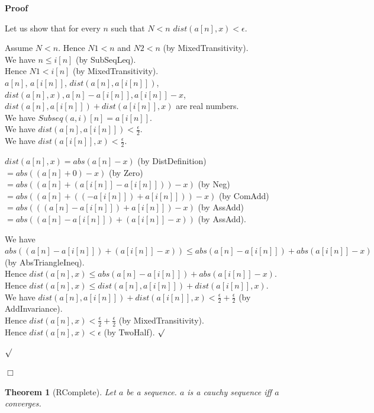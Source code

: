 \documentclass{article}
\newenvironment{forthel}{\begin{leftbar}}{\end{leftbar}}
\newenvironment{proof}{\noindent\textbf{Proof\ }}{\hspace*{\fill}$\Box$\medskip}
\newenvironment{subproof}{\begin{list}{}{}
		\item[\text{Proof}]}{\hfill $\surd$ \end{list}}
\newtheorem{theorem}{Theorem}
\newcommand{\halfeps}{\frac{\epsilon}{2}}
\newcommand{\dotequal}{=}
\begin{document}
\begin{forthel}
\begin{proof}
\begin{subproof}
			Let us show that for every $n$ such that $N < n$ $dist(a[n],x) < \epsilon$.
			\begin{subproof}
				Assume $N < n$. Hence $N1 < n$ and $N2 < n$ (by MixedTransitivity).\\
				We have $n \leq i[n]$ (by SubSeqLeq).\\
				Hence $N1 < i[n]$ (by MixedTransitivity).\\
				$a[n]$, $a[i[n]]$, $dist(a[n],a[i[n]])$, $dist(a[n],x), a[n] - a[i[n]], a[i[n]] - x$, $dist(a[n],a[i[n]]) + dist(a[i[n]],x)$ are real numbers.\\
				We have $Subseq(a,i)[n] = a[i[n]]$.\\
				We have $dist(a[n],a[i[n]]) < \halfeps$.\\
				We have $dist(a[i[n]],x) < \halfeps$.
				
				$dist(a[n],x) \dotequal abs(a[n] - x)$ (by DistDefinition)\\
				$\dotequal abs((a[n] + 0) - x)$ (by Zero)\\
				$\dotequal abs((a[n] + (a[i[n]] - a[i[n]])) - x)$ (by Neg)\\
				$\dotequal abs((a[n] + ((-a[i[n]]) + a[i[n]])) - x)$ (by ComAdd)\\
				$\dotequal abs(((a[n] - a[i[n]]) + a[i[n]]) - x)$ (by AssAdd)\\
				$\dotequal abs((a[n] - a[i[n]]) + (a[i[n]] - x))$ (by AssAdd).
				
				We have $abs((a[n] - a[i[n]]) + (a[i[n]] - x)) \leq abs(a[n] - a[i[n]]) + abs(a[i[n]] - x)$ (by AbsTriangleIneq).\\
				Hence $dist(a[n],x) \leq abs(a[n] - a[i[n]]) + abs(a[i[n]] - x)$.\\
				Hence $dist(a[n],x) \leq dist(a[n],a[i[n]]) + dist(a[i[n]],x)$.\\
				We have $dist(a[n],a[i[n]]) + dist(a[i[n]],x) < \halfeps + \halfeps$ (by AddInvariance).\\
				Hence $dist(a[n],x) < \halfeps + \halfeps$ (by MixedTransitivity).\\
				Hence $dist(a[n],x) < \epsilon$ (by TwoHalf).
			\end{subproof}
			
		\end{subproof}
	\end{proof}
	
	\begin{theorem}[RComplete]
		Let $a$ be a sequence. $a$ is a cauchy sequence iff $a$ converges.
	\end{theorem}
	

\end{forthel}
\end{document}
